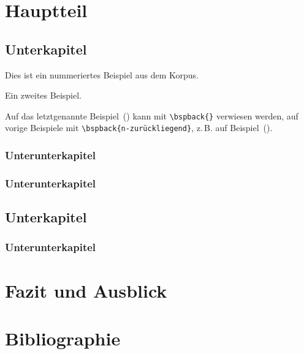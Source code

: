 \section{Hauptteil}

\subsection{Unterkapitel}
\lipsum[7]

\begin{quoting}
Dies ist ein nummeriertes Beispiel aus dem Korpus.
\end{quoting}

\begin{quoting}
Ein zweites Beispiel.
\end{quoting}

Auf das letztgenannte Beispiel~(\bspback{}) kann mit \texttt{\textbackslash bspback\{\}} verwiesen werden, auf vorige Beispiele mit \texttt{\textbackslash bspback\{n-zurückliegend\}}, z.\,B. auf Beispiel~().

\subsubsection{Unterunterkapitel}
\lipsum[8]

\subsubsection{Unterunterkapitel}
\lipsum[9]

\subsection{Unterkapitel}
\lipsum[10]

\subsubsection{Unterunterkapitel}
\lipsum[11]


\section{Fazit und Ausblick}
\lipsum[12]


\section{Bibliographie}
\printbibliography[heading=none]


